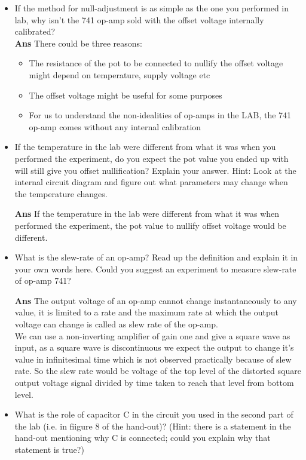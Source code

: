 \documentclass[12pt]{article}
\begin{document}
        \begin{itemize}
            \item If the method for null-adjustment is as simple as the one you performed
            in lab, why isn't the 741 op-amp sold with the offset voltage internally calibrated? \\
            
            \textbf{Ans} There could be three reasons:
            \begin{itemize}
                \item The resistance of the pot to be connected to nullify the offset voltage might depend on temperature, supply voltage etc
                \item The offset voltage might be useful for some purposes 
                \item For us to understand the non-idealities of op-amps in the LAB, the 741 op-amp comes without any internal calibration  
            \end{itemize}
            
            \item If the temperature in the lab were different from what it was when you performed the experiment, do you expect the pot value you ended up with will still give you offset nullification? Explain your answer. Hint: Look at the internal circuit diagram and figure out what parameters may change when the temperature changes.
            
            \textbf{Ans} If  the  temperature  in  the  lab  were  different  from  what  it  was  when performed the experiment, the pot value to nullify offset voltage would be different.
            
            \item What is the slew-rate of an op-amp? Read up the definition and explain it in your own words here. Could you suggest an experiment to measure slew-rate of op-amp 741?
            
            \textbf{Ans} The output voltage of an op-amp cannot change instantaneously to any value, it is limited to a rate and the maximum rate at which the output voltage can change is called as slew rate of the op-amp.\\
            
            We can use a non-inverting amplifier of gain one and give a square wave as input, as a square wave is discontinuous we expect the output to change it's value in infinitesimal time which is not observed practically because of slew rate. So the slew rate would be voltage of the top level of the distorted square output voltage signal divided by time taken to reach that level from bottom level. 
            
            \item  What is the role of capacitor C in the circuit you used in the second part of the lab (i.e. in fiigure 8 of the hand-out)? (Hint: there is a statement in the hand-out mentioning why C is connected; could you explain why that statement is true?)
        \end{itemize}
        
\end{document}
